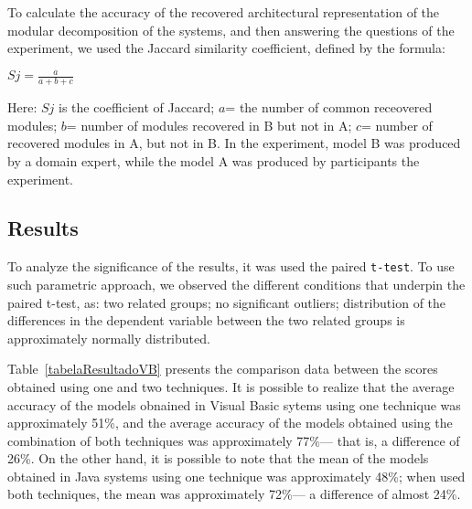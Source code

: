 {To calculate the accuracy of the recovered architectural representation of the modular decomposition of the systems, and then answering the questions of the experiment, we used the Jaccard similarity coefficient, defined by the formula:

\begin{center}
	$Sj= \frac{a}{a+b+c}$
\end{center}

Here: $Sj$ is the coefficient of Jaccard; $a$= the number of common receovered 
modules; $b$= number of modules recovered in B but not in A; $c$= number of recovered modules in A, but not in B. In the experiment, model B was produced by a domain expert, while the model A was produced by  participants  the experiment.

\subsection{Results}%


To analyze the significance of the results, it was used the paired \texttt{t-test}. To use such parametric approach, we observed the different conditions that underpin the paired t-test, as: two related groups; no significant outliers; distribution of the differences in the dependent variable between the two related groups is approximately normally distributed. 

Table~\ref{tabelaResultadoVB} presents the comparison data between the scores obtained using one and two techniques. It is possible to realize that the average accuracy of the models obnained in Visual Basic sytems using one technique 
was approximately 51\%, and the average accuracy of the models obtained using the combination of both techniques was approximately 77\%--- that is, a difference of 26\%. 
On the other hand, it is possible to note that the mean of the models obtained in Java systems using one technique was approximately 48\%; when used both techniques, 
the mean was approximately 72\%--- a difference of almost 24\%.

}
